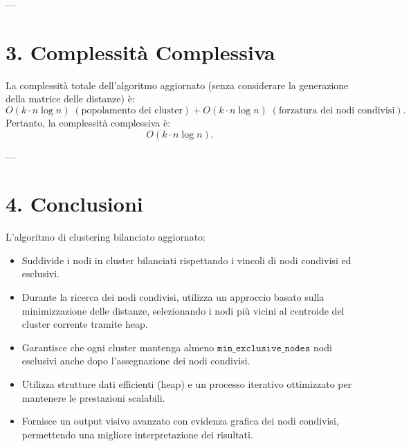 \documentclass[a4paper,12pt]{article}
\begin{document}
---

\section*{3. Complessità Complessiva}
La complessità totale dell'algoritmo aggiornato (senza considerare la generazione della matrice delle distanze) è:
\[
O(k \cdot n \log n) \; (\text{popolamento dei cluster}) + O(k \cdot n \log n) \; (\text{forzatura dei nodi condivisi}).
\]
Pertanto, la complessità complessiva è:
\[
O(k \cdot n \log n).
\]

---

\section*{4. Conclusioni}
L'algoritmo di clustering bilanciato aggiornato:
\begin{itemize}
    \item Suddivide i nodi in cluster bilanciati rispettando i vincoli di nodi condivisi ed esclusivi.
    \item Durante la ricerca dei nodi condivisi, utilizza un approccio basato sulla minimizzazione delle distanze, selezionando i nodi più vicini al centroide del cluster corrente tramite heap.
    \item Garantisce che ogni cluster mantenga almeno \( \texttt{min\_exclusive\_nodes} \) nodi esclusivi anche dopo l'assegnazione dei nodi condivisi.
    \item Utilizza strutture dati efficienti (heap) e un processo iterativo ottimizzato per mantenere le prestazioni scalabili.
    \item Fornisce un output visivo avanzato con evidenza grafica dei nodi condivisi, permettendo una migliore interpretazione dei risultati.
\end{itemize}
\end{document}
